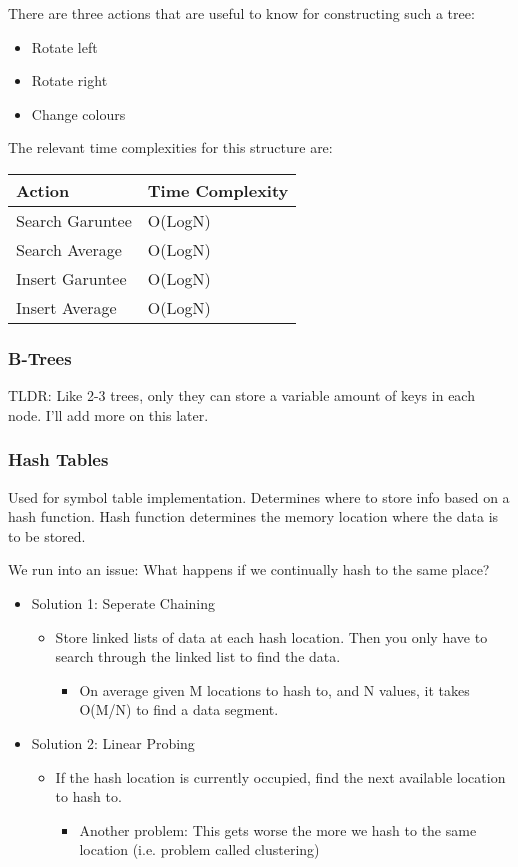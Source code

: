 \documentclass[11pt]{article}
\begin{document}
There are three actions that are useful to know for constructing such a tree:
\begin{itemize}
\item Rotate left
\item Rotate right
\item Change colours
\end{itemize}

The relevant time complexities for this structure are:
\begin{center}
\begin{tabular}{ll}
Action & Time Complexity\\
\hline
Search Garuntee & O(LogN)\\
Search Average & O(LogN)\\
Insert Garuntee & O(LogN)\\
Insert Average & O(LogN)\\
\end{tabular}
\end{center}

\subsubsection*{B-Trees}
\label{sec:orgaf9e60a}
TLDR: Like 2-3 trees, only they can store a variable amount of keys in each node. 
I'll add more on this later.

\subsubsection*{Hash Tables}
\label{sec:orgd31c523}
Used for symbol table implementation. Determines where to store info based on a hash function.
Hash function determines the memory location where the data is to be stored.


We run into an issue: What happens if we continually hash to the same place?
\begin{itemize}
\item Solution 1: Seperate Chaining
\begin{itemize}
\item Store linked lists of data at each hash location. Then you only have to search through the linked list to find the data.
\begin{itemize}
\item On average given M locations to hash to, and N values, it takes O(M/N) to find a data segment.
\end{itemize}
\end{itemize}
\item Solution 2: Linear Probing
\begin{itemize}
\item If the hash location is currently occupied, find the next available location to hash to.
\begin{itemize}
\item Another problem: This gets worse the more we hash to the same location (i.e. problem called clustering)
\end{itemize}
\end{itemize}
\end{itemize}
\end{document}
